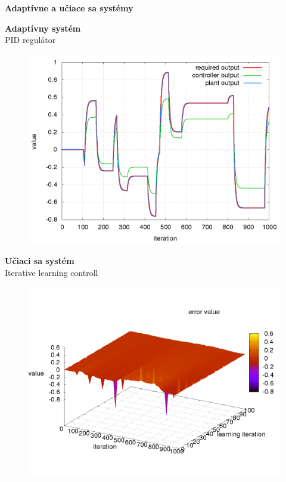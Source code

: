 \documentclass[xcolor=dvipsnames]{beamer}
\begin{document}
\begin{frame}{\bf Adaptívne a učiace sa systémy}

\begin{minipage}{.5\textwidth}


  {\bf Adaptívny systém} \\
  PID regulátor

  \begin{figure}[!htb]
  \includegraphics[scale=.15]{../pid_ilc/pid_result.png}
  \end{figure}

\end{minipage}%
\begin{minipage}{.5\textwidth}

  {\bf Učiaci sa systém} \\
  Iterative learning controll


  \begin{figure}[!htb]
  \includegraphics[scale=.15]{../pid_ilc/ilc_result_plant_error.png}
  \end{figure}



\end{minipage}
\end{frame}
\end{document}
